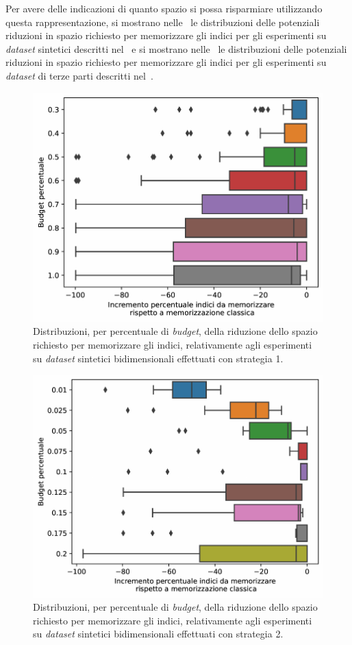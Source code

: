 Per avere delle indicazioni di quanto spazio si possa risparmiare utilizzando questa rappresentazione, si mostrano nelle~ le distribuzioni delle potenziali riduzioni in spazio richiesto per memorizzare gli indici per gli esperimenti su \emph{dataset} sintetici descritti nel~ e si mostrano nelle~ le distribuzioni delle potenziali riduzioni in spazio richiesto per memorizzare gli indici per gli esperimenti su \emph{dataset} di terze parti descritti nel~.
\begin{figure}
    \centering
    \includegraphics[width=.7\linewidth]{img/decremento_spazio_indici_exp2d_old.pdf}
    \caption{Distribuzioni, per percentuale di \emph{budget}, della riduzione dello spazio richiesto per memorizzare gli indici, relativamente agli esperimenti su \emph{dataset} sintetici bidimensionali effettuati con strategia 1.}
    \label{fig:dist_riduzione_synth_old}
\end{figure}%
\begin{figure}
    \centering
    \includegraphics[width=.7\linewidth]{img/decremento_spazio_indici_exp2d_new.pdf}
    \caption{Distribuzioni, per percentuale di \emph{budget}, della riduzione dello spazio richiesto per memorizzare gli indici, relativamente agli esperimenti su \emph{dataset} sintetici bidimensionali effettuati con strategia 2.}
    \label{fig:dist_riduzione_synth_new}
\end{figure}
